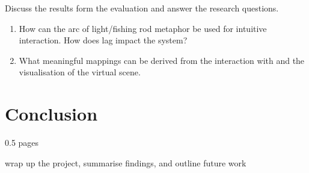 \documentclass[10pt,a4paper]{scrartcl}
\begin{document}
Discuss the results form the evaluation and answer the research questions. 

\begin{enumerate}
\item How can the arc of light/fishing rod metaphor be used for intuitive interaction. How does lag impact the system?
\item What meaningful mappings can be derived from the interaction with and the visualisation of the virtual scene.
\end{enumerate}

\section{Conclusion}
0.5 pages

wrap up the project, summarise findings, and outline future work




% 
% 
\end{document}
